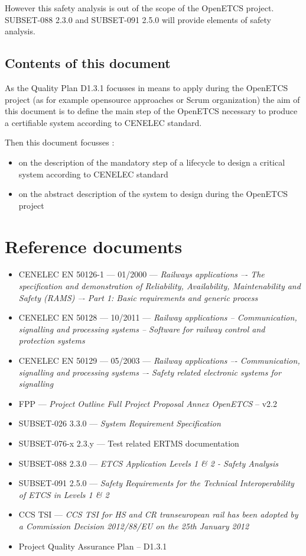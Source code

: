 However this safety analysis is out of the scope of the OpenETCS project. SUBSET-088 2.3.0 and SUBSET-091 2.5.0 will provide elements of safety analysis. 

\subsection{Contents of this document}

As the Quality Plan D1.3.1 focusses in means to apply during the OpenETCS project (as for example opensource approaches or Scrum organization)  the aim of this document is to define the main step of the OpenETCS necessary to produce a certifiable system according to CENELEC standard.

Then this document  focusses :
\begin{itemize}
\item on the description of the mandatory step of a lifecycle to design a critical system according to CENELEC standard
\item on the abstract description of the system to design during the OpenETCS project
\end{itemize}

\section{Reference documents}
\begin{itemize}
\item CENELEC EN 50126-1 --- 01/2000 --- \emph{Railways applications –- The specification and 
demonstration of Reliability, Availability, Maintenability and Safety (RAMS) –- Part 1: 
Basic requirements and generic process}
\item CENELEC EN 50128 --- 10/2011 --- \emph{Railway applications -- Communication, signalling and 
processing systems -- Software for railway control and protection systems}
\item CENELEC EN 50129 --- 05/2003 --- \emph{Railway applications –- Communication, signalling and 
processing systems –- Safety related electronic systems for signalling}
\item FPP --- \emph{Project Outline Full Project Proposal Annex OpenETCS} -- v2.2
\item SUBSET-026 3.3.0 --- \emph{System Requirement Specification}
\item SUBSET-076-x 2.3.y --- Test related ERTMS documentation
\item SUBSET-088 2.3.0 --- \emph{ETCS Application Levels 1 \& 2 - Safety Analysis}
\item SUBSET-091 2.5.0 --- \emph{Safety Requirements for the Technical Interoperability
of ETCS in Levels 1 \& 2}
\item CCS TSI --- \emph{ CCS TSI for HS and CR transeuropean rail has been adopted by a Commission Decision 2012/88/EU on the 25th January 2012}
\item Project Quality Assurance Plan -- D1.3.1
\end{itemize}

